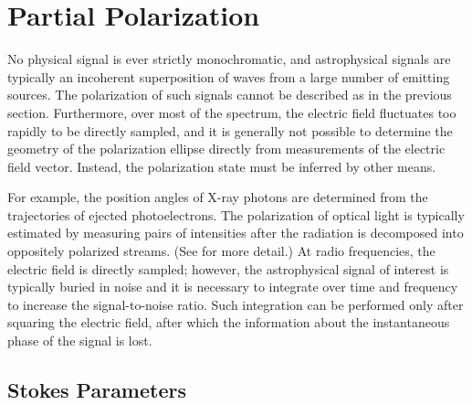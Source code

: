 \section{Partial Polarization}
\label{sec:statistics}

No physical signal is ever strictly monochromatic, and 
%
astrophysical signals are typically an incoherent superposition of waves from a large number of emitting sources.  The polarization of such signals cannot be described as in the previous section.
%
Furthermore, over most of the spectrum, the electric field fluctuates too rapidly to be directly sampled, and it is generally not possible to determine the geometry of the polarization ellipse directly from measurements of the electric field vector.
%
Instead, the polarization state must be inferred by other means.  

For example, the position angles of X-ray photons are determined from the trajectories of ejected photoelectrons.
%
The polarization of optical light is typically estimated by measuring pairs of intensities after the radiation is decomposed into oppositely polarized streams.
(See  for more detail.)
%
At radio frequencies, the electric field is directly sampled; however, the astrophysical signal of interest is typically buried in noise and it is necessary to integrate over time and frequency to increase the signal-to-noise ratio.  Such integration can be performed only after squaring the electric field, after which the information about the instantaneous phase of the signal is lost.

%
%

\subsection{Stokes Parameters}
\label{sec:Stokes_parameters}

